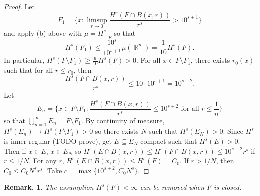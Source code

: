 \documentclass[11pt, a4paper]{memoir}
\DeclareMathOperator{\R}{{\mathbb{R}}}
\theoremstyle{change}
\theoremstyle{plain}
\theoremstyle{nonumberplain}
\newtheorem{remark}{Remark.}
\newtheorem{proof}{Proof}
\numberwithin{equation}{section}
\begin{document}
\begin{proof}
    Let
    \begin{equation*}
        F_1=\bigl\{x:\limsup_{r\to 0}\frac{H^s(F\cap B(x,r))}{r^s}>10^{s+1}\bigr\}
    \end{equation*}
    and apply (b) above with $\mu=H^s|_F$ so that
    \begin{equation*}
        H^s(F_1)\leq\frac{10^s}{10^{s+1}}\mu(\R^n)=\frac{1}{10}H^s(F).
    \end{equation*}
    In particular, $H^s(F\setminus F_1)\geq\frac{9}{10}H^s(F)>0$.
    For all $x\in F\setminus F_1$, there exists $r_0(x)$ such that for all $r\leq r_0$, then
    \begin{equation*}
        \frac{H^s(F\cap B(x,r))}{r^s}\leq 10\cdot 10^{s+1}=10^{s+2}.
    \end{equation*}
    Let
    \begin{equation*}
        E_n=\bigl\{x\in F\setminus F_1:\frac{H^s(F\cap B(x,r))}{r^s}\leq 10^{s+2}\text{ for all }r\leq\frac{1}{n}\bigr\}
    \end{equation*}
    so that $\bigcup_{n=1}^\infty E_n=F\setminus F_1$.
    By continuity of measure, $H^s(E_n)\to H^s(F\setminus F_1)>0$ so there exists $N$ such that $H^s(E_N)>0$.
    Since $H^s$ is inner regular (TODO prove), get $E\subseteq E_N$ compact such that $H^s(E)>0$.
    Then if $x\in E$, $x\in E_N$ so $H^s(E\cap B(x,r))\leq H^s(F\cap B(x,r))\leq 10^{s+2}r^s$ if $r\leq 1/N$.
    For any $r$, $H^s(E\cap B(x,r))\leq H^s(F)=C_0$.
    If $r>1/N$, then $C_0\leq C_0N^sr^s$.
    Take $c=\max\{10^{s+2},C_0N^s\}$.
\end{proof}
\begin{remark}
    The assumption $H^s(F)<\infty$ can be removed when $F$ is closed.
\end{remark}
\end{document}
